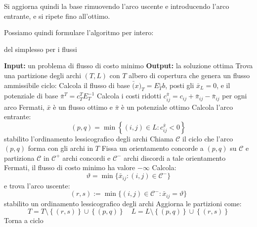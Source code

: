 \documentclass[a4paper,11pt]{article}
\begin{document}
Si aggiorna quindi la base rimuovendo l'arco uscente e introducendo l'arco entrante, e si ripete fino all'ottimo.

Possiamo quindi formulare l'algoritmo per intero:

\begin{algorithm}[H]
\caption{del simplesso per i flussi}
\begin{algorithmic}
	\STATE \textbf{Input:} un problema di flusso di costo minimo 
	\STATE \textbf{Output:} la soluzione ottima 
	\STATE Trova una partizione degli archi $(T,L)$ con $T$ albero di copertura che genera un flusso ammissibile
	\STATE \textsf{ciclo:}
	\STATE Calcola il flusso di base $\bar(x)_T = E_T^{_1} b$, posti gli $\bar{x}_L = 0$, e il potenziale di base $\bar{\pi}^T = c_T^T E_T^{-1}$
	\STATE Calcola i costi ridotti $c_{ij}^{\bar{\pi}} = c_{ij} + \bar{\pi}_{ij} - \bar{\pi}_{ij}$ per ogni arco
	\STATE Fermati, $\bar{x}$ è un flusso ottimo e $\bar{\pi}$ è un potenziale ottimo
\ELSE
		\STATE Calcola l'arco entrante: 
		$$
		(p, q) = \min \left\{ (i, j) \in L : c_{ij}^{\bar{\pi}} < 0 \right\}
		$$
		stabilito l'ordinamento lessicografico degli archi
		\STATE Chiama $\mathcal{C}$ il ciclo che l'arco $(p, q)$ forma con gli archi in $T$
		\STATE Fissa un orientamento concorde a $(p,q)$ su $\mathcal{C}$ e partiziona $\mathcal{C}$ in $\mathcal{C^+}$ archi concordi e $\mathcal{C^-}$ archi discordi a tale orientamento
	\ENDIF
		\STATE Fermati, il flusso di costo minimo ha valore $-\infty$ 
	\ELSE
		\STATE Calcola:
		$$
		\vartheta = \min\{ \bar{x}_{ij} : (i, j) \in \mathcal{C}^- \}
		$$
		e trova l'arco uscente: 
		$$ 
		(r, s) := \min\{ (i, j) \in \mathcal{C}^- : \bar{x}_{ij} = \vartheta \} 
		$$
		stabilito un ordinamento lessicografico degli archi
	\ENDIF
	\STATE Aggiorna le partizioni come:
	$$
	T = T \setminus \left\{ (r,s) \right\} \cup \left\{ (p, q) \right\} \quad L = L \setminus \left\{ (p, q) \right\} \cup \left\{ (r, s) \right\}
	$$
	\STATE Torna a \textsf{ciclo}
\end{algorithmic}
\end{algorithm}
\end{document}
